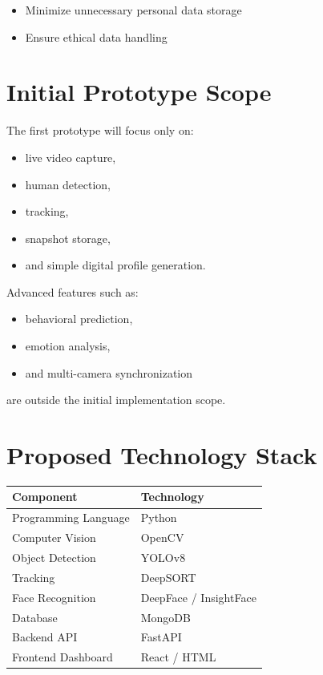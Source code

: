 \documentclass[12pt,a4paper]{article}
\begin{document}
\begin{itemize}
    \item Minimize unnecessary personal data storage
    \item Ensure ethical data handling
\end{itemize}

\section{Initial Prototype Scope}

The first prototype will focus only on:
\begin{itemize}
    \item live video capture,
    \item human detection,
    \item tracking,
    \item snapshot storage,
    \item and simple digital profile generation.
\end{itemize}

Advanced features such as:
\begin{itemize}
    \item behavioral prediction,
    \item emotion analysis,
    \item and multi-camera synchronization
\end{itemize}

are outside the initial implementation scope.

\section{Proposed Technology Stack}

\begin{longtable}{|p{6cm}|p{7cm}|}
\hline
\textbf{Component} & \textbf{Technology} \\
\hline
Programming Language & Python \\
\hline
Computer Vision & OpenCV \\
\hline
Object Detection & YOLOv8 \\
\hline
Tracking & DeepSORT \\
\hline
Face Recognition & DeepFace / InsightFace \\
\hline
Database & MongoDB \\
\hline
Backend API & FastAPI \\
\hline
Frontend Dashboard & React / HTML \\
\hline
\end{longtable}
\end{document}
